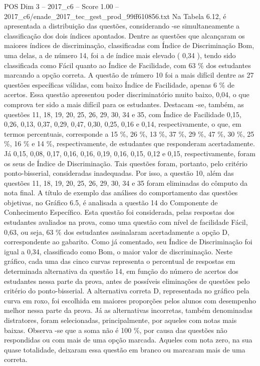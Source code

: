 \begin{textsample}{POS Dim 3 – 2017\_c6 – Score 1.00 – 2017\_c6/enade\_2017\_tec\_gest\_prod\_99ff610856.txt}
Na Tabela 6.12, é apresentada a distribuição das questões, considerando -se simultaneamente a classificação dos dois índices apontados.
Dentre as questões que alcançaram os maiores índices de discriminação, classificadas com Índice de Discriminação Bom, uma delas, a de número 14, foi a de índice mais elevado ( 0,34 ), tendo sido classificada como Fácil quanto ao Índice de Facilidade, com 63 \% dos estudantes marcando a opção correta.
A questão de número 10 foi a mais difícil dentre as 27 questões específicas válidas, com baixo Índice de Facilidade, apenas 6 \% de acertos.
Essa questão apresentou poder discriminatório muito baixo, 0,04, o que comprova ter sido a mais difícil para os estudantes.
Destacam -se, também, as questões 11, 18, 19, 20, 25, 26, 29, 30, 34 e 35, com Índice de Facilidade 0,15, 0,26, 0,13, 0,37, 0,29, 0,47, 0,30, 0,25, 0,16 e 0,14, respectivamente, o que, em termos percentuais, corresponde a 15 \%, 26 \%, 13 \%, 37 \%, 29 \%, 47 \%, 30 \%, 25 \%, 16 \% e 14 \%, respectivamente, de estudantes que responderam acertadamente.
Já 0,15, 0,08, 0,17, 0,16, 0,16, 0,19, 0,16, 0,15, 0,12 e 0,15, respectivamente, foram os seus de Índice de Discriminação.
Tais questões foram, portanto, pelo critério ponto-bisserial, consideradas inadequadas.
Por isso, a questão 10, além das questões 11, 18, 19, 20, 25, 26, 29, 30, 34 e 35 foram eliminadas do cômputo da nota final.
A título de exemplo das análises do comportamento das questões objetivas, no Gráfico 6.5, é analisada a questão 14 do Componente de Conhecimento Específico.
Esta questão foi considerada, pelas respostas dos estudantes avaliados na prova, como uma questão com nível de facilidade Fácil, 0,63, ou seja, 63 \% dos estudantes assinalaram acertadamente a opção D, correspondente ao gabarito.
Como já comentado, seu Índice de Discriminação foi igual a 0,34, classificado como Bom, o maior valor de discriminação.
Neste gráfico, cada uma das cinco curvas representa o percentual de respostas em determinada alternativa da questão 14, em função do número de acertos dos estudantes nessa parte da prova, antes de possíveis eliminações de questões pelo critério do ponto-bisserial.
A alternativa correta D, representada no gráfico pela curva em roxo, foi escolhida em maiores proporções pelos alunos com desempenho melhor nessa parte da prova.
Já as alternativas incorretas, também denominadas distratores, foram selecionadas, principalmente, por aqueles com notas mais baixas.
Observa -se que a soma não é 100 \%, por causa das questões não respondidas ou com mais de uma opção marcada.
Aqueles com nota zero, na sua quase totalidade, deixaram essa questão em branco ou marcaram mais de uma correta.

\end{textsample}
